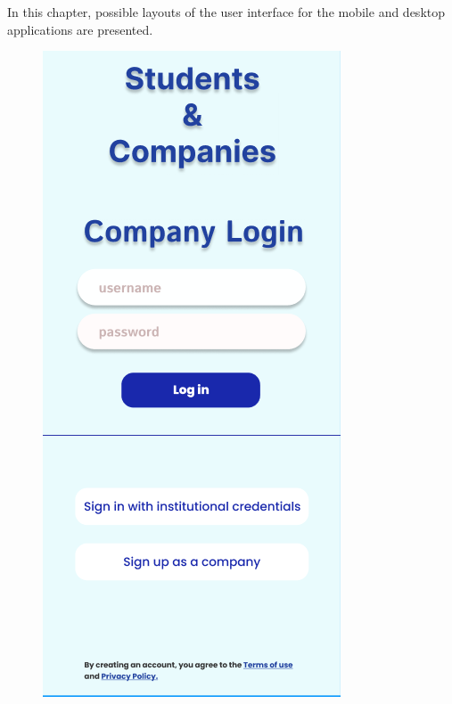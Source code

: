In this chapter, possible layouts of the user interface for the mobile and desktop applications are presented.
\bigskip
\bigskip

\begin{figure}[ht]
    \centering
    \begin{minipage}[b]{0.45\textwidth}
        \centering
        \includegraphics[width=\textwidth]{RASD-Latex/assets/UI images/login_phone.png}

\end{minipage}
\end{figure}
